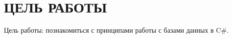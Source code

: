 \section{ЦЕЛЬ РАБОТЫ}

Цель работы: познакомиться с принципами работы с базами данных в C\#.

\newpage

